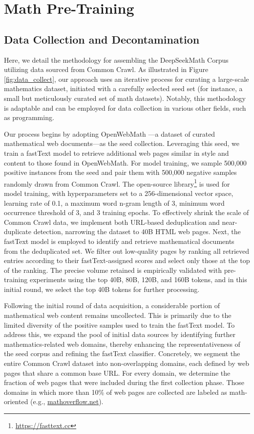 \section{Math Pre-Training}

\subsection{Data Collection and Decontamination} Here, we detail the methodology for assembling the DeepSeekMath Corpus utilizing data sourced from Common Crawl. As illustrated in Figure \ref{fig:data_collect}, our approach uses an iterative process for curating a large-scale mathematics dataset, initiated with a carefully selected seed set (for instance, a small but meticulously curated set of math datasets). Notably, this methodology is adaptable and can be employed for data collection in various other fields, such as programming.

Our process begins by adopting OpenWebMath \citep{openwebmath}—a dataset of curated mathematical web documents—as the seed collection. Leveraging this seed, we train a fastText model \citep{joulin2016fasttext} to retrieve additional web pages similar in style and content to those found in OpenWebMath. For model training, we sample 500,000 positive instances from the seed and pair them with 500,000 negative samples randomly drawn from Common Crawl. The open-source library\footnote{\url{https://fasttext.cc}} is used for model training, with hyperparameters set to a 256-dimensional vector space, learning rate of 0.1, a maximum word n-gram length of 3, minimum word occurrence threshold of 3, and 3 training epochs. To effectively shrink the scale of Common Crawl data, we implement both URL-based deduplication and near-duplicate detection, narrowing the dataset to 40B HTML web pages. Next, the fastText model is employed to identify and retrieve mathematical documents from the deduplicated set. We filter out low-quality pages by ranking all retrieved entries according to their fastText-assigned scores and select only those at the top of the ranking. The precise volume retained is empirically validated with pre-training experiments using the top 40B, 80B, 120B, and 160B tokens, and in this initial round, we select the top 40B tokens for further processing.

Following the initial round of data acquisition, a considerable portion of mathematical web content remains uncollected. This is primarily due to the limited diversity of the positive samples used to train the fastText model. To address this, we expand the pool of initial data sources by identifying further mathematics-related web domains, thereby enhancing the representativeness of the seed corpus and refining the fastText classifier. Concretely, we segment the entire Common Crawl dataset into non-overlapping domains, each defined by web pages that share a common base URL. For every domain, we determine the fraction of web pages that were included during the first collection phase. Those domains in which more than 10\% of web pages are collected are labeled as math-oriented (e.g., \url{mathoverflow.net}). 


